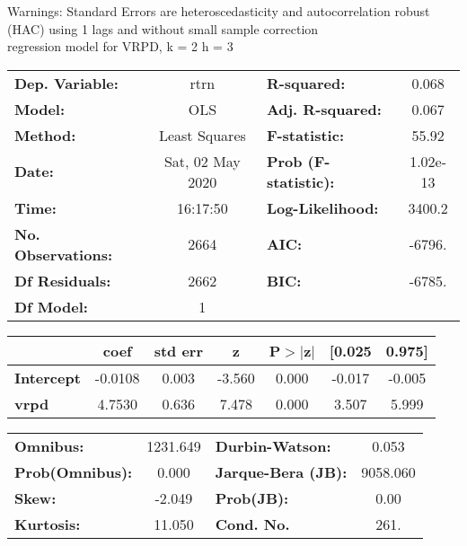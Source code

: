 Warnings: \newline
 [1] Standard Errors are heteroscedasticity and autocorrelation robust (HAC) using 1 lags and without small sample correction\\ 

regression model for VRPD, k = 2 h = 3\begin{center}
\begin{tabular}{lclc}
\toprule
\textbf{Dep. Variable:}    &       rtrn       & \textbf{  R-squared:         } &     0.068   \\
\textbf{Model:}            &       OLS        & \textbf{  Adj. R-squared:    } &     0.067   \\
\textbf{Method:}           &  Least Squares   & \textbf{  F-statistic:       } &     55.92   \\
\textbf{Date:}             & Sat, 02 May 2020 & \textbf{  Prob (F-statistic):} &  1.02e-13   \\
\textbf{Time:}             &     16:17:50     & \textbf{  Log-Likelihood:    } &    3400.2   \\
\textbf{No. Observations:} &        2664      & \textbf{  AIC:               } &    -6796.   \\
\textbf{Df Residuals:}     &        2662      & \textbf{  BIC:               } &    -6785.   \\
\textbf{Df Model:}         &           1      & \textbf{                     } &             \\
\bottomrule
\end{tabular}
\begin{tabular}{lcccccc}
                   & \textbf{coef} & \textbf{std err} & \textbf{z} & \textbf{P$> |$z$|$} & \textbf{[0.025} & \textbf{0.975]}  \\
\midrule
\textbf{Intercept} &      -0.0108  &        0.003     &    -3.560  &         0.000        &       -0.017    &       -0.005     \\
\textbf{vrpd}      &       4.7530  &        0.636     &     7.478  &         0.000        &        3.507    &        5.999     \\
\bottomrule
\end{tabular}
\begin{tabular}{lclc}
\textbf{Omnibus:}       & 1231.649 & \textbf{  Durbin-Watson:     } &    0.053  \\
\textbf{Prob(Omnibus):} &   0.000  & \textbf{  Jarque-Bera (JB):  } & 9058.060  \\
\textbf{Skew:}          &  -2.049  & \textbf{  Prob(JB):          } &     0.00  \\
\textbf{Kurtosis:}      &  11.050  & \textbf{  Cond. No.          } &     261.  \\
\bottomrule
\end{tabular}
\end{center}

